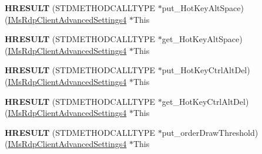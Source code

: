 \begin{DoxyCompactItemize}
\item 
\mbox{\label{struct_m_s_t_s_c_lib_1_1_i_ms_rdp_client_advanced_settings4_vtbl_a93d58635cedcc3d624d46cea561d59f2}} 
{\bfseries H\+R\+E\+S\+U\+LT} (S\+T\+D\+M\+E\+T\+H\+O\+D\+C\+A\+L\+L\+T\+Y\+PE $\ast$put\+\_\+\+Hot\+Key\+Alt\+Space)(\hyperlink{interface_m_s_t_s_c_lib_1_1_i_ms_rdp_client_advanced_settings4}{I\+Ms\+Rdp\+Client\+Advanced\+Settings4} $\ast$This
\item 
\mbox{\label{struct_m_s_t_s_c_lib_1_1_i_ms_rdp_client_advanced_settings4_vtbl_ae4980e6af283f5adb1cedd3ac4a87a45}} 
{\bfseries H\+R\+E\+S\+U\+LT} (S\+T\+D\+M\+E\+T\+H\+O\+D\+C\+A\+L\+L\+T\+Y\+PE $\ast$get\+\_\+\+Hot\+Key\+Alt\+Space)(\hyperlink{interface_m_s_t_s_c_lib_1_1_i_ms_rdp_client_advanced_settings4}{I\+Ms\+Rdp\+Client\+Advanced\+Settings4} $\ast$This
\item 
\mbox{\label{struct_m_s_t_s_c_lib_1_1_i_ms_rdp_client_advanced_settings4_vtbl_a5596b854afef771d0419a594e3eaf336}} 
{\bfseries H\+R\+E\+S\+U\+LT} (S\+T\+D\+M\+E\+T\+H\+O\+D\+C\+A\+L\+L\+T\+Y\+PE $\ast$put\+\_\+\+Hot\+Key\+Ctrl\+Alt\+Del)(\hyperlink{interface_m_s_t_s_c_lib_1_1_i_ms_rdp_client_advanced_settings4}{I\+Ms\+Rdp\+Client\+Advanced\+Settings4} $\ast$This
\item 
\mbox{\label{struct_m_s_t_s_c_lib_1_1_i_ms_rdp_client_advanced_settings4_vtbl_a590e0cedfceb3217f03e0b29dae9403a}} 
{\bfseries H\+R\+E\+S\+U\+LT} (S\+T\+D\+M\+E\+T\+H\+O\+D\+C\+A\+L\+L\+T\+Y\+PE $\ast$get\+\_\+\+Hot\+Key\+Ctrl\+Alt\+Del)(\hyperlink{interface_m_s_t_s_c_lib_1_1_i_ms_rdp_client_advanced_settings4}{I\+Ms\+Rdp\+Client\+Advanced\+Settings4} $\ast$This
\item 
\mbox{\label{struct_m_s_t_s_c_lib_1_1_i_ms_rdp_client_advanced_settings4_vtbl_a29a47f51294da8455345860763d02587}} 
{\bfseries H\+R\+E\+S\+U\+LT} (S\+T\+D\+M\+E\+T\+H\+O\+D\+C\+A\+L\+L\+T\+Y\+PE $\ast$put\+\_\+order\+Draw\+Threshold)(\hyperlink{interface_m_s_t_s_c_lib_1_1_i_ms_rdp_client_advanced_settings4}{I\+Ms\+Rdp\+Client\+Advanced\+Settings4} $\ast$This

\end{DoxyCompactItemize}
